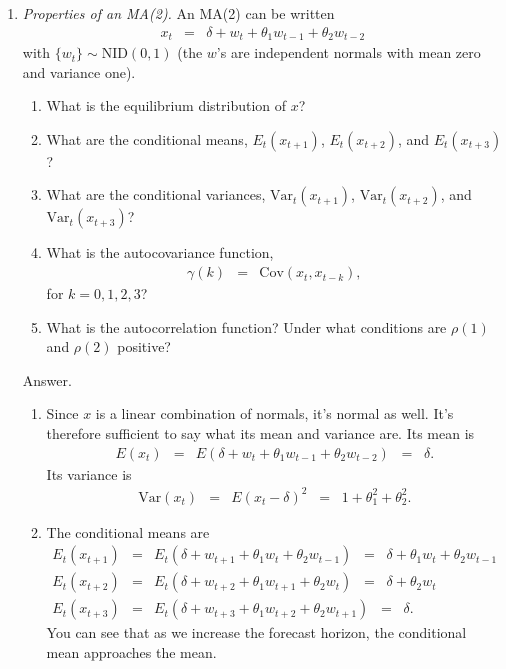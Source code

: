 \documentclass[11pt]{article}
\begin{document}
\begin{enumerate}
\item {\it Properties of an MA(2).\/}
An MA(2) can be written
\begin{eqnarray*}
    x_t &=& \delta + w_t + \theta_1 w_{t-1} + \theta_2 w_{t-2}
\end{eqnarray*}
with $\{ w_t \} \sim \mbox{NID}(0,1)$
(the $w$'s are independent normals with mean zero and variance one).
%
\begin{enumerate}
\item What is the equilibrium distribution of $x$?
\item What are the conditional means,
$E_t (x_{t+1})$, $E_t (x_{t+2})$, and  $E_t (x_{t+3})$?
\item What are the conditional variances,
$\mbox{Var}_t (x_{t+1})$,
$\mbox{Var}_t (x_{t+2})$,
and $\mbox{Var}_t (x_{t+3})$?
\item What is the autocovariance function,
\begin{eqnarray*}
    \gamma(k)  &=& \mbox{Cov}(x_t,x_{t-k}),
\end{eqnarray*}
for $k=0,1,2,3$?
\item What is the autocorrelation function?
Under what conditions are $\rho(1)$ and $\rho(2)$ positive?
\end{enumerate}
%
Answer.
\begin{enumerate}
\item Since $x$ is a linear combination of normals,
it's normal as well.
It's therefore sufficient to say what its mean and variance are.
Its mean is
\begin{eqnarray*}
   E( x_t) &=& E (\delta + w_t + \theta_1 w_{t-1} + \theta_2 w_{t-2})
        \;\;=\;\; \delta .
\end{eqnarray*}
Its variance is
\begin{eqnarray*}
   \mbox{Var} ( x_t) &=& E (x_t - \delta)^2
        \;\;=\;\;  1 + \theta_1^2 + \theta_2^2 .
\end{eqnarray*}
\item The conditional means are
\begin{eqnarray*}
   E_t ( x_{t+1}) &=& E_t (\delta + w_{t+1} + \theta_1 w_{t} + \theta_2 w_{t-1})
        \;\;=\;\; \delta + \theta_1 w_{t} + \theta_2 w_{t-1} \\
   E_t ( x_{t+2}) &=& E_t (\delta + w_{t+2} + \theta_1 w_{t+1} + \theta_2 w_{t})
        \;\;=\;\; \delta + \theta_2 w_{t} \\
   E_t ( x_{t+3}) &=& E_t (\delta + w_{t+3} + \theta_1 w_{t+2} + \theta_2 w_{t+1})
        \;\;=\;\; \delta .
\end{eqnarray*}
You can see that  as we increase the forecast horizon,
the conditional mean approaches the mean.


\end{enumerate}
\end{enumerate}
\end{document}
